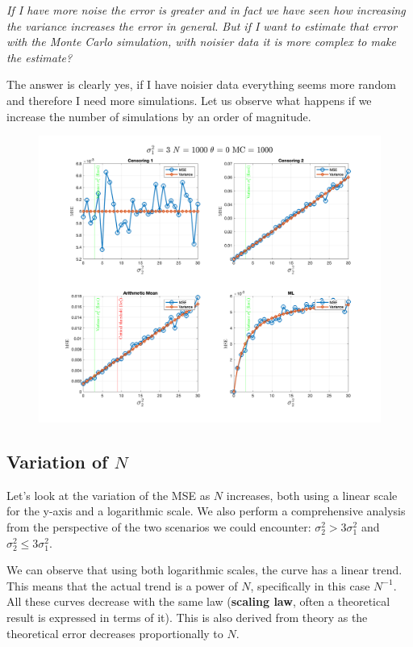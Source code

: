 \textit{If I have more noise the error is greater and in fact we have seen how increasing the variance increases the error in general. But if I want to estimate that error with the Monte Carlo simulation, with noisier data it is more complex to make the estimate?}

The answer is clearly yes, if I have noisier data everything seems more random and therefore I need more simulations. Let us observe what happens if we increase the number of simulations by an order of magnitude.

\begin{figure}[H]
    \centering
    \includegraphics[width=\textwidth]{./figures/appendix_a/figure_4.png}
\end{figure}

\subsection*{Variation of $N$}

Let's look at the variation of the MSE as $N$ increases, both using a linear scale for the y-axis and a logarithmic scale. We also perform a comprehensive analysis from the perspective of the two scenarios we could encounter: $\sigma_2^2>3\sigma_1^2$ and $\sigma_2^2\le3\sigma_1^2$.

We can observe that using both logarithmic scales, the curve has a linear trend. This means that the actual trend is a power of $N$, specifically in this case $N^{-1}$. All these curves decrease with the same law (\textbf{scaling law}, often a theoretical result is expressed in terms of it). This is also derived from theory as the theoretical error decreases proportionally to $N$.

